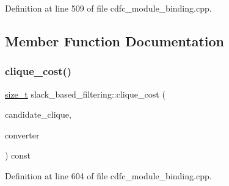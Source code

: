 Definition at line 509 of file cdfc\+\_\+module\+\_\+binding.\+cpp.



\subsection{Member Function Documentation}
\mbox{\label{structslack__based__filtering_ab0e7478f290e25d2bb830056c0f35b71}} 
\subsubsection{\texorpdfstring{clique\+\_\+cost()}{clique\_cost()}}
{\footnotesize\ttfamily \hyperlink{tutorial__fpt__2017_2intro_2sixth_2test_8c_a7c94ea6f8948649f8d181ae55911eeaf}{size\+\_\+t} slack\+\_\+based\+\_\+filtering\+::clique\+\_\+cost (\begin{DoxyParamCaption}\item[{const \hyperlink{classCustomOrderedSet}{Custom\+Ordered\+Set}$<$ \hyperlink{clique__covering__graph_8hpp_a9cb45047ea8c5ed95a8cfa90494345aa}{C\+\_\+vertex} $>$ \&}]{candidate\+\_\+clique,  }\item[{const std\+::map$<$ \hyperlink{clique__covering__graph_8hpp_a9cb45047ea8c5ed95a8cfa90494345aa}{C\+\_\+vertex}, \hyperlink{graph_8hpp_abefdcf0544e601805af44eca032cca14}{vertex} $>$ \&}]{converter }\end{DoxyParamCaption}) const\hspace{0.3cm}{\ttfamily [inline]}}



Definition at line 604 of file cdfc\+\_\+module\+\_\+binding.\+cpp.

\mbox{\label{structslack__based__filtering_aae278a39030283f377963834005d2ed0}} 
